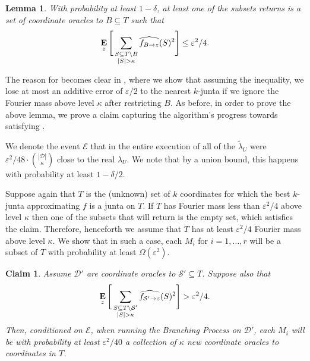 \documentclass[10pt,a4paper]{article}
\theoremstyle{plain}
\newtheorem{lemma}[theorem]{Lemma}
\newtheorem{claim}[theorem]{Claim}
\theoremstyle{remark}
\theoremstyle{plain}
\providecommand{\E}{}
\renewcommand{\E}{\mathop{\bf E\/}}
\newcommand{\eps}{\varepsilon}
\renewcommand{\hat}{\widehat}
\renewcommand{\tilde}{\widetilde}
\newcommand{\calE}{\mathcal{E}}
\newcommand{\calS}{\mathcal{S}}
\newcommand{\InfluentialCoords}{\calS}
\newcommand{\InfluentialOracles}{\mathcal{D}}
\newcommand{\specialset}{T}
\newcommand{\fourierCutoff}{\kappa}
\renewcommand{\epsilon}{\varepsilon}
\begin{document}
\begin{lemma}
\label{lemma:phase-one-correctness}
With probability at least $1-\delta$, at least one of the subsets  returns is a set of coordinate oracles  to  $B\subseteq T$  such that
\begin{equation}\label{eq:B T condition}
\E_z\Bigg[\sum_{\substack{S \subseteq \specialset\setminus B \\ |S| > \fourierCutoff}} \hat{f_{B \to z}}(S)^2\Bigg] \leq \epsilon^2/4.	
\end{equation}
\end{lemma}
%
The reason for  becomes clear in , where we show that assuming the inequality, we lose at most an additive error of $\eps/2$ to the nearest $k$-junta if we ignore the Fourier mass above level $\fourierCutoff$ after restricting $B$. 
As before, in order to prove the above lemma, we prove a claim capturing the algorithm's progress towards satisfying .

We denote the event $\calE$ that in the entire execution of  all of the $\tilde{\lambda}_U$ were $\eps^2/48 \cdot \binom{|\InfluentialOracles|}{\fourierCutoff}$ close to the real $\lambda_U$. We note that by a union bound,  this happens with probability at least $1-\delta/2$. 

Suppose again that $\specialset$ is the (unknown) set of $k$ coordinates for which the best $k$-junta approximating $f$ is a junta on $\specialset$. 
If $\specialset$ has Fourier mass less than $\eps^2/4$ above level $\fourierCutoff$ then one of the subsets that  will return is the empty set, which satisfies the claim. Therefore, henceforth we assume that $\specialset$ has at least $\eps^2/4$ Fourier mass above level $\fourierCutoff$. 
We show that in such a case, each $M_i$ for $i=1, \ldots, r$ will be a subset of $T$ with probability at least $\Omega(\eps^2)$.


\begin{claim}
\label{claim:prob-of-sample}
Assume $\InfluentialOracles'$ are coordinate oracles to $\InfluentialCoords' \subseteq \specialset$.
Suppose also that 
$$\E_z\Bigg[\sum_{\substack{S \subseteq \specialset\setminus \InfluentialCoords' \\ |S| > \fourierCutoff}} \hat{f_{\InfluentialCoords' \to z}}(S)^2\Bigg]  > \epsilon^2/4.$$
Then, conditioned on $\calE$, when running the Branching Process on $\InfluentialOracles'$, each $M_i$ will be with probability at least $\eps^2/40$  a collection of $\fourierCutoff$ new coordinate oracles to coordinates in  $\specialset$.
%
%
%
\end{claim}
\end{document}
